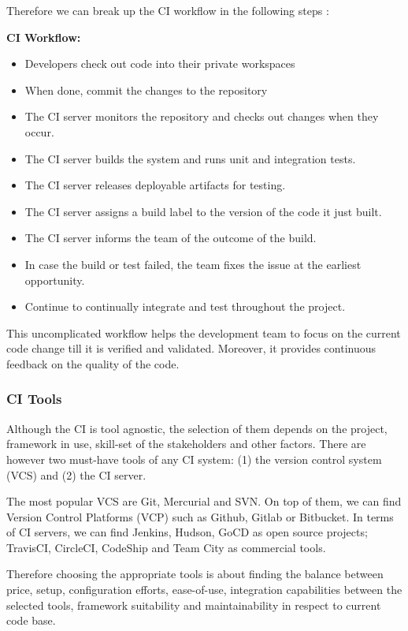 Therefore we can break up the CI workflow in the following steps \citep{Fowler2006}:

\textbf{CI Workflow:}

\begin{itemize}
\item Developers check out code into their private workspaces
\item When done, commit the changes to the repository
\item The CI server monitors the repository and checks out changes when they occur.
\item The CI server builds the system and runs unit and integration tests.
\item The CI server releases deployable artifacts for testing.
\item The CI server assigns a build label to the version of the code it just built.
\item The CI server informs the team of the outcome of the build.
\item In case the build or test failed, the team fixes the issue at the earliest opportunity.
\item Continue to continually integrate and test throughout the project.
\end{itemize}

This uncomplicated workflow helps the development team to focus on the current code change till it is verified and validated. Moreover, it provides continuous feedback on the quality of the code.

\subsubsection{CI Tools}

Although the CI is tool agnostic, the selection of them depends on the project, framework in use, skill-set of the stakeholders and other factors. There are however two must-have tools of any CI system: (1) the version control system (VCS) and (2) the CI server.

The most popular VCS are Git, Mercurial and SVN. On top of them, we can find Version Control Platforms (VCP) such as Github, Gitlab or Bitbucket. In terms of CI servers, we can find Jenkins, Hudson, GoCD as open source projects; TravisCI, CircleCI, CodeShip and Team City as commercial tools.

Therefore choosing the appropriate tools is about finding the balance between price, setup, configuration efforts, ease-of-use, integration capabilities between the selected tools, framework suitability and maintainability in respect to current code base.

